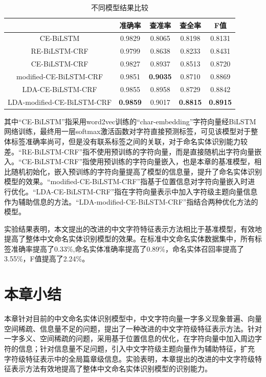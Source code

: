 \documentclass[winfonts,master,oneside,nobackinfo]{njuthesis}
\begin{document}
\begin{table}[h]
\centering
\begin{tabular}{|c|c|c|c|c|}
\hline
                           & 准确率 & 查准率 & 查全率& F值 \\ \hline
CE-BiLSTM             &     0.9829          &   0.8065             &  0.8198      &   0.8131    \\ \hline
RE-BiLSTM-CRF              &     0.9799          &   0.8638             &  0.8233      &   0.8431    \\ \hline
CE-BiLSTM-CRF              &     0.9827          &   0.8937           &    0.8513         & 0.8720   \\ \hline
modified-CE-BiLSTM-CRF     &     0.9851         &    \textbf{0.9035}            &   0.8710         & 0.8869  \\ \hline
LDA-CE-BiLSTM-CRF          &      0.9855         &    0.8958            &    0.8729         & 0.8842   \\ \hline
LDA-modified-CE-BiLSTM-CRF &      \textbf{0.9859}         &   0.9017             &  \textbf{0.8815}           &\textbf{0.8915}    \\ \hline
\end{tabular}
\caption{不同模型结果比较}
\label{all-model}
\end{table}

其中“CE-BiLSTM”指采用word2vec训练的“char-embedding”字符向量经BiLSTM网络训练，最终用一层softmax激活函数对字符直接预测标签，可见该模型对于整体标签准确率尚可，但是没有联系标签之间的关联，对于命名实体识别能力较差。“RE-BiLSTM-CRF”指不使用预训练的字符向量，而是直接随机出字符向量嵌入。“CE-BiLSTM-CRF”指使用预训练的字符向量嵌入，也是本章的基准模型，相比随机初始化，嵌入预训练的字符向量提高了模型的信息量，提升了命名实体识别模型的效果。“modified-CE-BiLSTM-CRF”指基于位置信息对字符向量嵌入时进行优化。“LDA-CE-BiLSTM-CRF”指在字符向量表示中加入字符级主题向量信息作为辅助信息的方法。“LDA-modified-CE-BiLSTM-CRF”指结合两种优化方法的模型。

实验结果表明，本文提出的改进的中文字符特征表示方法相比于基准模型，有效地提高了整体中文命名实体识别模型的效果。在标准中文命名实体数据集中，所有标签准确率提高了0.33\%,命名实体准确率提高了0.89\%，命名实体召回率提高了3.55\%，F值提高了2.24\%。

\section{本章小结}

本章针对目前的中文命名实体识别模型中，中文字符向量一字多义现象普遍、向量空间稀疏、信息量不足的问题，提出了一种改进的中文字符级特征表示方法。针对一字多义、空间稀疏的问题，采用基于位置信息的优化，在字符向量中加入周边字符的信息；针对信息量不足问题，引入中文字符级主题向量作为辅助特征，扩充 字符级特征表示中的全局篇章级信息。实验表明，本章提出的改进的中文字符级特征表示方法有效地提高了整体中文命名实体识别模型的识别能力。
\end{document}
